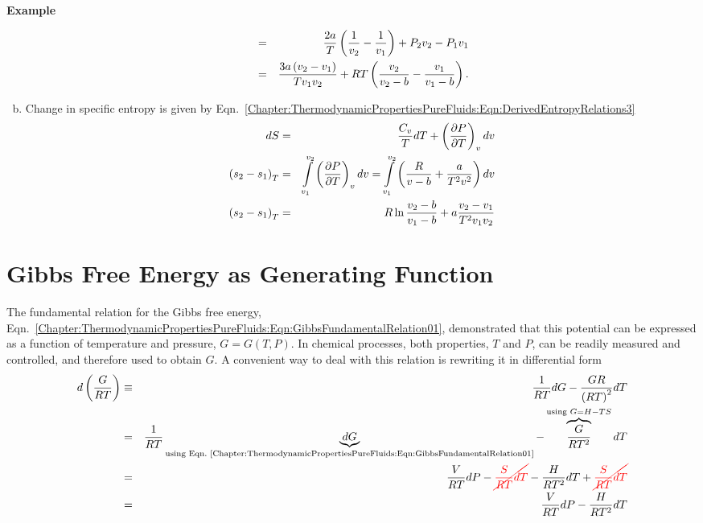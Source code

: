 \begin{MyExample}{\begin{center}{\bf Example}\end{center}}
\begin{enumerate}[a)]
\begin{eqnarray}
                                           &=&  \frc{2a}{T}\left(\frc{1}{v_{2}}-\frc{1}{v_{1}}\right) + P_{2}v_{2} - P_{1}v_{1}\nonumber \\
                                           &=&  \frc{3a\left(v_{2}-v_{1}\right)}{Tv_{1}v_{2}} + RT\left(\frc{v_{2}}{v_{2}-b} - \frc{v_{1}}{v_{1}-b}\right). \nonumber
                \end{eqnarray}
            \item Change in specific entropy is given by Eqn.~\ref{Chapter:ThermodynamicPropertiesPureFluids:Eqn:DerivedEntropyRelations3}
                \begin{eqnarray}
                     dS &=& \frc{C_{v}}{T}dT + \Partial[P]{T}{v}dv \nonumber \\
                    \left(s_{2}-s_{1}\right)_{T} &=& \int\limits_{v_{1}}^{v_{2}}\Partial[P]{T}{v}dv =  \int\limits_{v_{1}}^{v_{2}}\left(\frc{R}{v-b} + \frc{a}{T^{2}v^{2}}\right)dv \nonumber \\
                    \left(s_{2}-s_{1}\right)_{T} &=& R\ln{\frc{v_{2}-b}{v_{1}-b}} + a\frc{v_{2}-v_{1}}{T^{2}v_{1}v_{2}}
                \end{eqnarray}

         \end{enumerate}
  
   \end{MyExample}
   

\section{Gibbs Free Energy as Generating Function}\label{Chapter:ThermodynamicPropertiesPureFluids:Section:GibbsGeneratingFunction}

The fundamental relation for the Gibbs free energy, Eqn.~\ref{Chapter:ThermodynamicPropertiesPureFluids:Eqn:GibbsFundamentalRelation01}, demonstrated that this potential can be expressed as a function of temperature and pressure, $G=G(T,P)$. In chemical processes, both properties, $T$ and $P$, can be readily measured and controlled, and therefore used to obtain $G$. A convenient way to deal with this relation is rewriting it in differential form
    \begin{eqnarray}
         d\left(\frc{G}{RT}\right) &\equiv& \frc{1}{RT}dG - \frc{GR}{\left(RT\right)^{2}}dT \nonumber \\
                                   &=& \frc{1}{RT}\underbrace{dG}_{\text{using Eqn.~\ref{Chapter:ThermodynamicPropertiesPureFluids:Eqn:GibbsFundamentalRelation01}}} - \overbrace{\frc{G}{RT^{2}}}^{\text{using }G=H-TS}dT \nonumber \\
                                   &=& \frc{V}{RT}dP - \red{\cancel{\frc{S}{RT}dT}} - \frc{H}{RT^{2}}dT + \red{\cancel{\frc{S}{RT}dT}} \nonumber \\
                                   &=& \frc{V}{RT}dP - \frc{H}{RT^{2}}dT\label{Chapter:ThermodynamicPropertiesPureFluids:Eqn:GibbsGeneratingFunction}
    \end{eqnarray}


